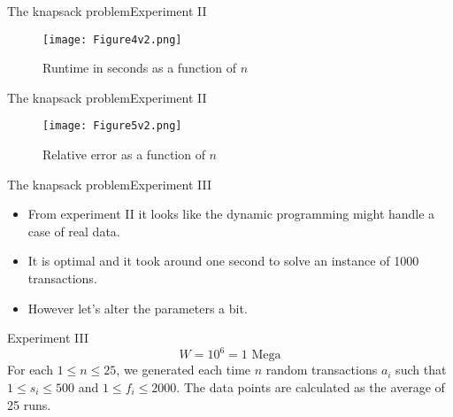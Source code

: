 \documentclass{beamer}
\begin{document}
\begin{frame}{The knapsack problem}{Experiment II} %
    \begin{figure}
        \centering
        \texttt{[image: Figure4v2.png]}
        \caption{Runtime in seconds as a function of $n$}
    \end{figure}
\end{frame}

\begin{frame}{The knapsack problem}{Experiment II} %
    \begin{figure}
        \centering
        \texttt{[image: Figure5v2.png]}
        \caption{Relative error as a function of $n$}
    \end{figure}
\end{frame}
\begin{frame}{The knapsack problem}{Experiment III} %
    \begin{itemize}
        \item {From experiment II it looks like the dynamic programming 
        might handle a case of real data.}
        \item {It is optimal and it took around one second to solve an 
        instance of 1000 transactions.}
        \item {However let's alter the parameters a bit.}
    \end{itemize}
    \begin{block}{Experiment III}
    $$ W= 10^6 = 1 \text{ Mega} $$ 
    For each $1\leq n \leq 25$, we generated each time $n$ random transactions
    $a_i$ such that $1\leq s_i\leq 500$ and $1\leq f_i \leq 2000$. The 
    data points are calculated as the average of 25 runs.
    \end{block}
\end{frame}
\end{document}
